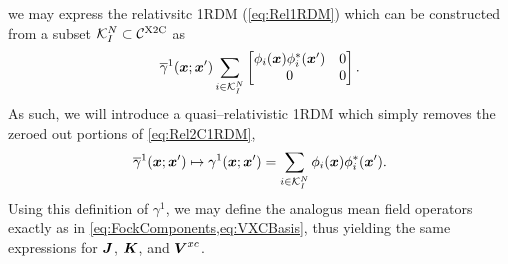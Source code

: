we may express the relativsitc 1RDM  (\cref{eq:Rel1RDM}) which can be constructed from a 
subset $\mathcal K_I^N \subset \mathcal C^{\mathrm{X2C}}$ as
\begin{equation}
  \label{eq:Rel2C1RDM}
  \overline{\gamma}^1(\boldsymbol{x}; \boldsymbol{x}')
    \sum_{i \in \mathcal K^N_I} 
    \begin{bmatrix} 
      \phi_i(\boldsymbol{x}) \phi_i^{*}(\boldsymbol{x}') & 0 \\ 0 & 0 
    \end{bmatrix}. 
\end{equation}
As such, we will introduce a quasi--relativistic 1RDM which simply removes the zeroed out portions of \cref{eq:Rel2C1RDM},
\begin{equation}
  \label{eq:QRel2C1RDM}
  \overline{\gamma}^1(\boldsymbol{x}; \boldsymbol{x}') \mapsto {\gamma}^1(\boldsymbol{x}; \boldsymbol{x}') =
    \sum_{i \in \mathcal K^N_I} 
      \phi_i(\boldsymbol{x}) \phi_i^{*}(\boldsymbol{x}').
\end{equation}
Using this definition of $\gamma^1$, we may define the analogus mean field operators exactly as in 
\cref{eq:FockComponents,eq:VXCBasis}, thus yielding the same expressions for $\boldsymbol{J}$, $\boldsymbol{K}$, and $\boldsymbol{V}^{xc}$.


